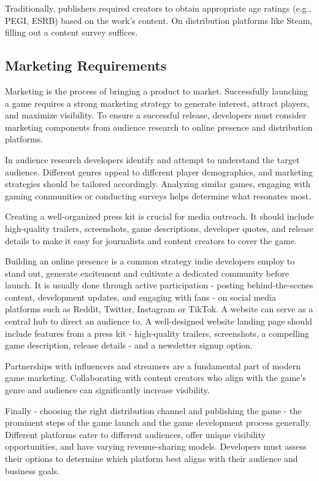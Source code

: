 Traditionally, publishers required creators to obtain appropriate age ratings (e.g., PEGI, ESRB) based on the work’s content. On distribution platforms like Steam, filling out a content survey suffices.

\subsection{Marketing Requirements}
Marketing is the process of bringing a product to market. Successfully launching a game requires a strong marketing strategy to generate interest, attract players, and maximize visibility. To ensure a successful release, developers must consider marketing components from audience research to online presence and distribution platforms.

In audience research developers identify and attempt to understand the target audience. Different genres appeal to different player demographics, and marketing strategies should be tailored accordingly. Analyzing similar games, engaging with gaming communities or conducting surveys helps determine what resonates most.

Creating a well-organized press kit is crucial for media outreach. It should include high-quality trailers, screenshots, game descriptions, developer quotes, and release details to make it easy for journalists and content creators to cover the game.

Building an online presence is a common strategy indie developers employ to stand out, generate excitement and cultivate a dedicated community before launch. It is usually done through active participation - posting behind-the-scenes content, development updates, and engaging with fans - on social media platforms such as Reddit, Twitter, Instagram or TikTok. A website can serve as a central hub to direct an audience to. A well-designed website landing page should include features from a press kit - high-quality trailers, screenshots, a compelling game description, release details - and a newsletter signup option.

Partnerships with influencers and streamers are a fundamental part of modern game marketing. Collaborating with content creators who align with the game’s genre and audience can significantly increase visibility.

Finally - choosing the right distribution channel and publishing the game - the prominent steps of the game launch and the game development process generally. Different platforms cater to different audiences, offer unique visibility opportunities, and have varying revenue-sharing models. Developers must assess their options to determine which platform best aligns with their audience and business goals.

